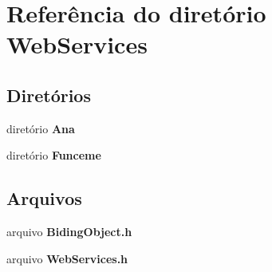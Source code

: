 \section{Referência do diretório Web\+Services}
\label{dir_f226232c5566ce46c4fed5ef2598ae1a}
\subsection*{Diretórios}
\begin{DoxyCompactItemize}
\item 
diretório {\bf Ana}
\item 
diretório {\bf Funceme}
\end{DoxyCompactItemize}
\subsection*{Arquivos}
\begin{DoxyCompactItemize}
\item 
arquivo {\bf Biding\+Object.\+h}
\item 
arquivo {\bf Web\+Services.\+h}
\end{DoxyCompactItemize}
